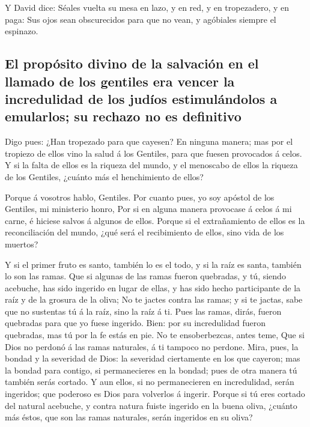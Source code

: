  Y David dice: Séales vuelta su mesa en lazo, y en red, y
en tropezadero, y en paga:  Sus ojos sean obscurecidos
para que no vean, y agóbiales siempre el espinazo.

\hypertarget{el-propuxf3sito-divino-de-la-salvaciuxf3n-en-el-llamado-de-los-gentiles-era-vencer-la-incredulidad-de-los-juduxedos-estimuluxe1ndolos-a-emularlos-su-rechazo-no-es-definitivo}{%
\subsection{El propósito divino de la salvación en el llamado de los
gentiles era vencer la incredulidad de los judíos estimulándolos a
emularlos; su rechazo no es
definitivo}\label{el-propuxf3sito-divino-de-la-salvaciuxf3n-en-el-llamado-de-los-gentiles-era-vencer-la-incredulidad-de-los-juduxedos-estimuluxe1ndolos-a-emularlos-su-rechazo-no-es-definitivo}}

 Digo pues: ¿Han tropezado para que cayesen? En ninguna
manera; mas por el tropiezo de ellos vino la salud á los Gentiles, para
que fuesen provocados á celos.  Y si la falta de ellos es
la riqueza del mundo, y el menoscabo de ellos la riqueza de los
Gentiles, ¿cuánto más el henchimiento de ellos?

 Porque á vosotros hablo, Gentiles. Por cuanto pues, yo
soy apóstol de los Gentiles, mi ministerio honro,  Por si
en alguna manera provocase á celos á mi carne, é hiciese salvos á
algunos de ellos.  Porque si el extrañamiento de ellos es
la reconciliación del mundo, ¿qué será el recibimiento de ellos, sino
vida de los muertos?

 Y si el primer fruto es santo, también lo es el todo, y
si la raíz es santa, también lo son las ramas.  Que si
algunas de las ramas fueron quebradas, y tú, siendo acebuche, has sido
ingerido en lugar de ellas, y has sido hecho participante de la raíz y
de la grosura de la oliva;  No te jactes contra las
ramas; y si te jactas, sabe que no sustentas tú á la raíz, sino la raíz
á ti.  Pues las ramas, dirás, fueron quebradas para que
yo fuese ingerido.  Bien: por su incredulidad fueron
quebradas, mas tú por la fe estás en pie. No te ensoberbezcas, antes
teme,  Que si Dios no perdonó á las ramas naturales, á ti
tampoco no perdone.  Mira, pues, la bondad y la severidad
de Dios: la severidad ciertamente en los que cayeron; mas la bondad para
contigo, si permanecieres en la bondad; pues de otra manera tú también
serás cortado.  Y aun ellos, si no permanecieren en
incredulidad, serán ingeridos; que poderoso es Dios para volverlos á
ingerir.  Porque si tú eres cortado del natural acebuche,
y contra natura fuiste ingerido en la buena oliva, ¿cuánto más éstos,
que son las ramas naturales, serán ingeridos en su oliva?

